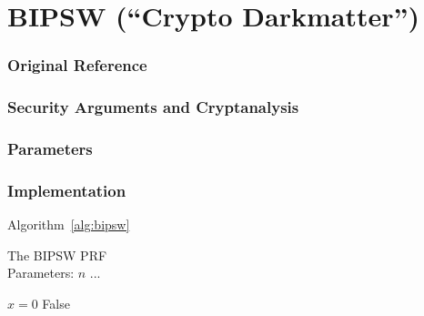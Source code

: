 \section{BIPSW (``Crypto Darkmatter'')}
\label{sec:ealpn}


\subsubsection*{Original Reference}

\subsubsection*{Security Arguments and Cryptanalysis}


\subsubsection*{Parameters}


\subsubsection*{Implementation}

Algorithm~\ref{alg:bipsw}

\begin{algorithm}
  \caption{\label{alg:bipsw}The BIPSW PRF \\
    Parameters: $n$ ...}
  \begin{algorithmic}
    \State $x = 0$
    \Return False
  \end{algorithmic}
\end{algorithm}




